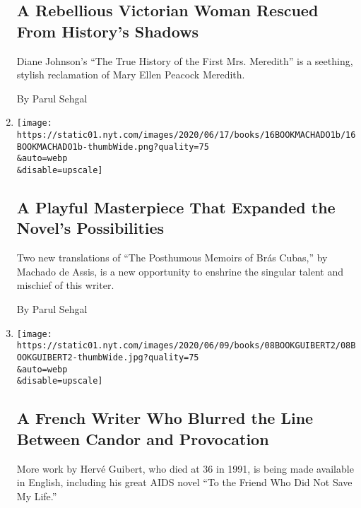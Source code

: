 \begin{enumerate}
  \hypertarget{a-rebellious-victorian-woman-rescued-from-historys-shadows}{%
  \subsection{A Rebellious Victorian Woman Rescued From History's
  Shadows}\label{a-rebellious-victorian-woman-rescued-from-historys-shadows}}

  Diane Johnson's ``The True History of the First Mrs. Meredith'' is a
  seething, stylish reclamation of Mary Ellen Peacock Meredith.

  By Parul Sehgal
\item
  \href{/2020/06/16/books/review-posthumous-memoirs-bras-cubas-machado-de-assis.html}{}

  \texttt{[image: https://static01.nyt.com/images/2020/06/17/books/16BOOKMACHADO1b/16BOOKMACHADO1b-thumbWide.png?quality=75\\\&auto=webp\\\&disable=upscale]}

  \hypertarget{a-playful-masterpiece-that-expanded-the-novels-possibilities}{%
  \subsection{A Playful Masterpiece That Expanded the Novel's
  Possibilities}\label{a-playful-masterpiece-that-expanded-the-novels-possibilities}}

  Two new translations of ``The Posthumous Memoirs of Brás Cubas,'' by
  Machado de Assis, is a new opportunity to enshrine the singular talent
  and mischief of this writer.

  By Parul Sehgal
\item
  \href{/2020/06/08/books/review-herve-guibert-to-friend-who-did-not-save-my-life-written-in-invisible-ink.html}{}

  \texttt{[image: https://static01.nyt.com/images/2020/06/09/books/08BOOKGUIBERT2/08BOOKGUIBERT2-thumbWide.jpg?quality=75\\\&auto=webp\\\&disable=upscale]}

  \hypertarget{a-french-writer-who-blurred-the-line-between-candor-and-provocation}{%
  \subsection{A French Writer Who Blurred the Line Between Candor and
  Provocation}\label{a-french-writer-who-blurred-the-line-between-candor-and-provocation}}

  More work by Hervé Guibert, who died at 36 in 1991, is being made
  available in English, including his great AIDS novel ``To the Friend
  Who Did Not Save My Life.''


\end{enumerate}
